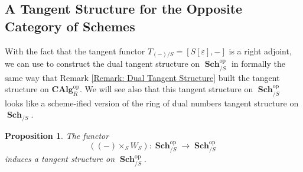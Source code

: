 \documentclass{amsart}
\newtheorem{proposition}[equation]{Proposition}
\theoremstyle{definition}
\DeclareMathOperator{\op}{op}
\newcommand{\CAlg}[1]{\mathbf{CAlg}_{#1}}
\let\epsilon\varepsilon
\DeclareMathOperator{\Sch}{\mathbf{Sch}}
\let\epsilon\varepsilon
\numberwithin{equation}{subsection}
\begin{document}
\subsection{A Tangent Structure for the Opposite Category of Schemes}
With the fact that the tangent functor $T_{(-)/S} = [S[\epsilon],-]$ is a right adjoint, we can use \cite[Proposition 5.17]{GeoffRobinDiffStruct} to construct the dual tangent structure on $\Sch_{/S}^{\op}$ in formally the same way that Remark \ref{Remark: Dual Tangent Structure} built the tangent structure on $\CAlg{R}^{\op}$. We will see also that this tangent structure on $\Sch_{/S}^{\op}$ looks like a scheme-ified version of the ring of dual numbers tangent structure on $\Sch_{/S}$.

\begin{proposition}\label{Prop: Section Tangents: Dual Numbers for Schemes Tangents}
The functor
\[
\left((-) \times_S W_S\right):\Sch_{/S}^{\op} \to \Sch_{/S}^{\op}
\]
induces a tangent structure on $\Sch_{/S}^{\op}$.
\end{proposition}
\end{document}
